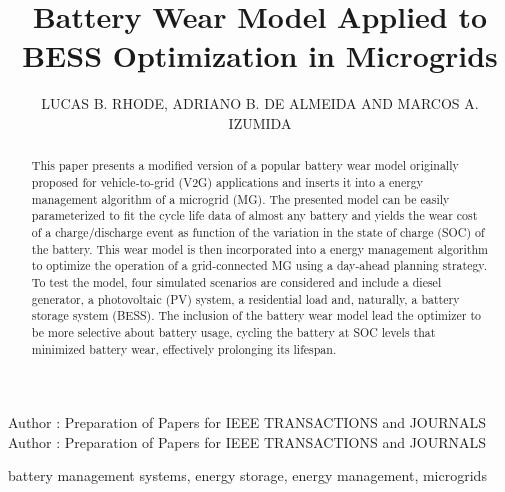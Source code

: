 \documentclass{ieeeaccess}
\begin{document}

\title{Battery Wear Model Applied to BESS Optimization in Microgrids}

\author{
	\uppercase{Lucas B. Rhode},
	\uppercase{Adriano B. de Almeida}
	\uppercase{and Marcos A. Izumida}
}
\address[1]{Sustainable Energies Center, CERTI Foundation, Brazil (e-mail: lrh@certi.org.br)}
\address[2]{Western Parana State University, Brazil (e-mail: adriano.almeida@unioeste.br)}
\address[3]{Sustainable Energies Center, CERTI Foundation, Brazil (e-mail: mlz@certi.org.br)}

\markboth
{Author \headeretal: Preparation of Papers for IEEE TRANSACTIONS and JOURNALS}
{Author \headeretal: Preparation of Papers for IEEE TRANSACTIONS and JOURNALS}


\begin{abstract}
    This paper presents a modified version of a popular battery wear model originally proposed for vehicle-to-grid (V2G) applications and inserts it into a energy management algorithm of a microgrid (MG). The presented model can be easily parameterized to fit the cycle life data of almost any battery and yields the wear cost of a charge/discharge event as function of the variation in the state of charge (SOC) of the battery. This wear model is then incorporated into a energy management algorithm to optimize the operation of a grid-connected MG using a day-ahead planning strategy. To test the model, four simulated scenarios are considered and include a diesel generator, a photovoltaic (PV) system, a residential load and, naturally, a battery storage system (BESS). The inclusion of the battery wear model lead the optimizer to be more selective about battery usage, cycling the battery at SOC levels that minimized battery wear, effectively prolonging its lifespan.
\end{abstract}

\begin{keywords}
    battery management systems, energy storage, energy management, microgrids
\end{keywords}

\titlepgskip=-15pt

\maketitle
\end{document}
